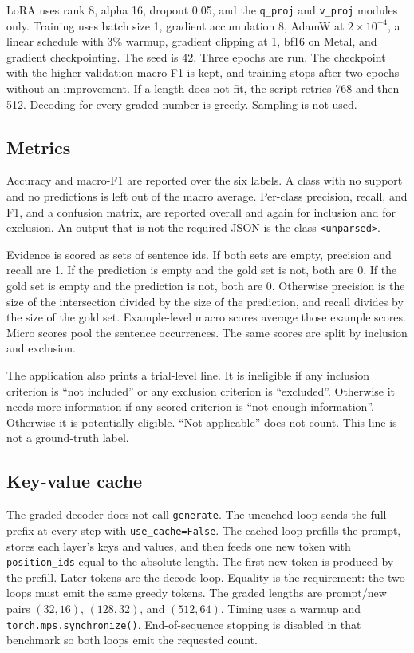 \documentclass[conference]{IEEEtran}
\begin{document}
LoRA uses rank 8, alpha 16, dropout 0.05, and the \texttt{q\_proj} and \texttt{v\_proj} modules only.
Training uses batch size 1, gradient accumulation 8, AdamW at $2\times10^{-4}$, a linear schedule with 3\% warmup, gradient clipping at 1, bf16 on Metal, and gradient checkpointing.
The seed is 42.
Three epochs are run.
The checkpoint with the higher validation macro-F1 is kept, and training stops after two epochs without an improvement.
If a length does not fit, the script retries 768 and then 512.
Decoding for every graded number is greedy.
Sampling is not used.

\subsection{Metrics}
Accuracy and macro-F1 are reported over the six labels.
A class with no support and no predictions is left out of the macro average.
Per-class precision, recall, and F1, and a confusion matrix, are reported overall and again for inclusion and for exclusion.
An output that is not the required JSON is the class \texttt{<unparsed>}.

Evidence is scored as sets of sentence ids.
If both sets are empty, precision and recall are 1.
If the prediction is empty and the gold set is not, both are 0.
If the gold set is empty and the prediction is not, both are 0.
Otherwise precision is the size of the intersection divided by the size of the prediction, and recall divides by the size of the gold set.
Example-level macro scores average those example scores.
Micro scores pool the sentence occurrences.
The same scores are split by inclusion and exclusion.

The application also prints a trial-level line.
It is ineligible if any inclusion criterion is ``not included'' or any exclusion criterion is ``excluded''.
Otherwise it needs more information if any scored criterion is ``not enough information''.
Otherwise it is potentially eligible.
``Not applicable'' does not count.
This line is not a ground-truth label.

\subsection{Key-value cache}
The graded decoder does not call \texttt{generate}.
The uncached loop sends the full prefix at every step with \texttt{use\_cache=False}.
The cached loop prefills the prompt, stores each layer's keys and values, and then feeds one new token with \texttt{position\_ids} equal to the absolute length.
The first new token is produced by the prefill.
Later tokens are the decode loop.
Equality is the requirement: the two loops must emit the same greedy tokens.
The graded lengths are prompt/new pairs $(32,16)$, $(128,32)$, and $(512,64)$.
Timing uses a warmup and \texttt{torch.mps.synchronize()}.
End-of-sequence stopping is disabled in that benchmark so both loops emit the requested count.
\end{document}
